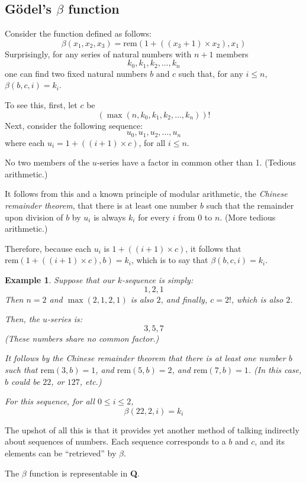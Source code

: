 \documentclass[12pt]{report}
\theoremstyle{nonumberplain}
\newtheorem{ex}{Example}
\newcommand{\Q}{\textbf{\textup{Q}}}
\begin{document}
\subsection*{G\"odel's $β$ function}

Consider the function defined as follows:
\[β(x_1, x_2, x_3) = \mathrm{rem}(1 + ((x_3 + 1) × x_2), x_1)\]
\noindent Surprisingly, for any series of natural numbers with $n + 1$ members
\[k_0, k_1, k_2, \dotsc , k_n\]
\noindent one can find two fixed natural numbers $b$ and $c$ such that, for any $i \le n$, $β(b, c, i) = k_i$.

To see this, first, let $c$ be
\[(\max(n, k_0, k_1, k_2, \dotsc , k_n))! \]
\noindent Next, consider the following sequence:
\[u_0, u_1, u_2, \dotsc , u_n\]
where each $u_i = 1 + ((i + 1) × c)$, for all $i \le n$.

No two members of the $u$-series have a factor in common other than 1. (Tedious arithmetic.)

It follows from this and a known principle of modular arithmetic, the \emph{Chinese remainder theorem}, that there is at least one number $b$ such that the remainder upon division of $b$ by $u_i$ is always $k_i$ for every $i$ from 0 to $n$. (More tedious arithmetic.)

Therefore, because each $u_i$ is $1 + ((i + 1) × c)$, it follows that $\mathrm{rem}(1 + ((i + 1) × c), b) = k_i$, which is to say that $β (b, c, i) = k_i$.

\begin{ex}
Suppose that our $k$-sequence is simply: \[1, 2, 1\]
\noindent Then $n = 2$ and $\max(2, 1, 2, 1)$ is also $2$,
 	 and finally, $c = 2!$, which is also $2$.

Then, the $u$-series is:	\[3, 5, 7\] \noindent (These numbers share no common factor.)

It follows by the Chinese remainder
theorem that there is at least one number $b$
such that $\mathrm{rem}(3, b) = 1$, and
$\mathrm{rem}(5, b) = 2$, and
$\mathrm{rem}(7, b) = 1$.
(In this case, $b$ could be $22$, or $127$, etc.)

For this sequence, for all $0 \le i \le 2$,
\[β (22, 2, i) = k_i\]
\end{ex}

\noindent The upshot of all this is that it provides yet another method of talking indirectly about sequences of numbers. Each sequence corresponds to a $b$ and $c$, and its elements can be ``retrieved'' by $β$.

\begin{mt}
The $β$ function is representable in \Q.
\end{mt}
\end{document}

